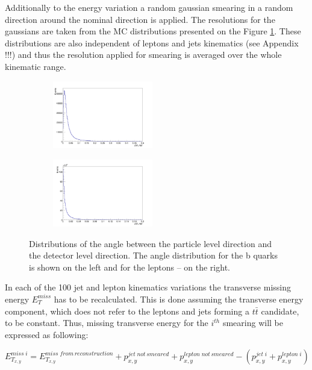 Additionally to the energy variation a random gaussian smearing in a random direction around the nominal direction is applied. The resolutions for
the gaussians are taken from the MC distributions presented on the Figure \ref{fig:dAngle}. These distributions are also independent of leptons and
jets kinematics (see Appendix !!!) and thus the resolution applied for smearing is averaged over the whole kinematic range.

\begin{figure}[t]
\centering
\begin{subfigure}
  \centering
  \includegraphics[width=0.48\textwidth]{05_kinReco/plots/dan_jet.png}
\end{subfigure}
\begin{subfigure}
  \centering
  \includegraphics[width=0.48\textwidth]{05_kinReco/plots/dan_lep.png}
\end{subfigure}
\caption{Distributions of the angle between the particle level direction and the detector level direction.
The angle distribution for the b quarks is shown on the left and for the leptons -- on the right.}
\label{fig:dAngle}
\end{figure}

In each of the 100 jet and lepton kinematics variations the transverse missing energy $E_{T}^{miss}$ has to be recalculated. This is done
assuming the transverse energy component, which does not refer to the leptons and jets forming a $t\bar{t}$ candidate, to be constant. Thus,
missing transverse energy for the $i^{th}$ smearing will be expressed as following:

\begin{equation}
 E^{miss\;i}_{T_{x,y}} = E^{miss \; from \, reconstruction}_{T_{x,y}} + p^{jet \; not\,smeared}_{x,y} + p^{lepton\;not\,smeared}_{x,y} - (p^{jet\;i}_{x,y} + p^{lepton\;i}_{x,y})
\end{equation}

